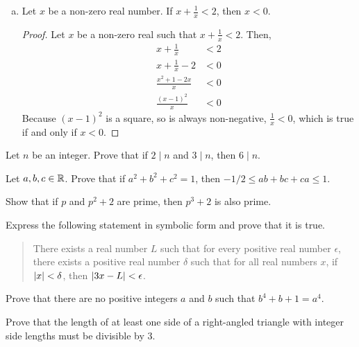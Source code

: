 \begin{enumerate}[(a)]
\begin{proof}
          Then, $x = \frac{p}{q}$ for integers $p$ and $q$.
          Also, $x+y = \frac{n}{m}$ for integers $n$ and $m$.
          Substituting, $\frac{p}{q} + y = \frac{n}{m}$.
          Rearranging,
          \begin{equation*}
            \frac{p}{q} + y = \frac{n}{m}        \iff
            p+yq            = \frac{qn}{m}       \iff
            y               = \frac{qn - mp}{qm}
          \end{equation*}
          but if $y$ equals the ratio of two integers ($qn-mp$ and $qm$), by definition, $y$ is rational.

          Therefore, by contradiction, the sum of a rational number and an irrational number is irrational.
        \end{proof}

  \item Let $x$ be a non-zero real number. If $x + \frac{1}{x} < 2$, then $x < 0$.
        \begin{proof}
          Let $x$ be a non-zero real such that $x + \frac{1}{x} < 2$. Then,
          \begin{align*}
            x + \frac{1}{x}        & < 2 \\
            x + \frac{1}{x} - 2    & < 0 \\
            \frac{x^2 + 1 - 2x}{x} & < 0 \\
            \frac{(x-1)^2}{x}      & < 0
          \end{align*}
          Because $(x-1)^2$ is a square, so is always non-negative, $\frac{1}{x} < 0$, which is true if and only if $x < 0$.
        \end{proof}
\end{enumerate}



\question Let $n$ be an integer.
Prove that if $2 \mid n$ and $3 \mid n$, then $6 \mid n$.

\question Let $a,b,c\in\mathbb{R}$.
Prove that if $a^2 + b^2 + c^2 = 1$, then $-1/2 \leq ab+bc+ca \leq 1$.

\question Show that if $p$ and $p^2+2$ are prime, then $p^3+2$ is also prime.

\question Express the following statement in symbolic form and prove that it is true.
\begin{quote}
  There exists a real number $L$ such that for every positive real number $\epsilon$,
  there exists a positive real number $\delta$ such that for all real numbers $x$,
  if $\abs{x} < \delta$, then $\abs{3x-L} < \epsilon$.
\end{quote}

\question Prove that there are no positive integers $a$ and $b$ such that $b^4+b+1 = a^4$.

\question Prove that the length of at least one side of a right-angled triangle with integer side lengths must be divisible by 3.

